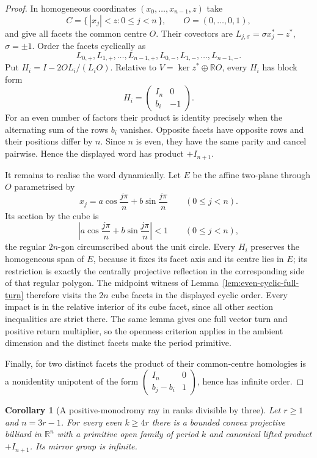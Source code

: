 \documentclass[11pt,a4paper]{article}
\theoremstyle{plain}
\newtheorem{corollary}[theorem]{Corollary}
\theoremstyle{definition}
\theoremstyle{remark}
\begin{document}
\begin{proof}
In homogeneous coordinates $(x_0,\ldots,x_{n-1},z)$ take
\[
 C=\{\,|x_j|<z:0\le j<n\,\},\qquad O=(0,\ldots,0,1),
\]
and give all facets the common centre $O$.  Their covectors are
$L_{j,\sigma}=\sigma x_j^*-z^*$, $\sigma=\pm1$.  Order the facets cyclically as
\[
 L_{0,+},L_{1,+},\ldots,L_{n-1,+},
 L_{0,-},L_{1,-},\ldots,L_{n-1,-}.
\]
Put $H_i=I-2OL_i/(L_iO)$.  Relative to
$V=\ker z^*\oplus\mathbb RO$, every $H_i$ has block form
\[
                    H_i=\begin{pmatrix}I_n&0\\ b_i&-1\end{pmatrix}.
\]
For an even number of factors their product is identity precisely when the
alternating sum of the rows $b_i$ vanishes.  Opposite facets have opposite rows
and their positions differ by $n$.  Since $n$ is even, they have the same parity
and cancel pairwise.  Hence the displayed word has product $+I_{n+1}$.

It remains to realise the word dynamically.  Let $E$ be the affine two-plane
through $O$ parametrised by
\[
 x_j=a\cos\frac{j\pi}{n}+b\sin\frac{j\pi}{n}\qquad(0\le j<n).
\]
Its section by the cube is
\[
 \left|a\cos\frac{j\pi}{n}+b\sin\frac{j\pi}{n}\right|<1
 \qquad(0\le j<n),
\]
the regular $2n$-gon circumscribed about the unit circle.  Every $H_i$ preserves
the homogeneous span of $E$, because it fixes its facet axis and its centre lies
in $E$; its restriction is exactly the centrally projective reflection in the
corresponding side of that regular polygon.  The midpoint witness of
Lemma~\ref{lem:even-cyclic-full-turn} therefore visits the $2n$ cube facets in
the displayed cyclic order.  Every impact is in the relative interior of its
cube facet, since all other section inequalities are strict there.  The same
lemma gives one full vector turn and positive return multiplier, so the openness
criterion applies in the ambient dimension and the distinct facets make the
period primitive.

Finally, for two distinct facets the product of their common-centre homologies is
a nonidentity unipotent of the form
$\left(\begin{smallmatrix}I_n&0\\ b_j-b_i&1\end{smallmatrix}\right)$, hence has
infinite order.
\end{proof}

\begin{corollary}[A positive-monodromy ray in ranks divisible by three]
\label{cor:join-positive-ray}
Let $r\ge1$ and $n=3r-1$.  For every even $k\ge4r$ there is a bounded convex
projective billiard in $\mathbb R^n$ with a primitive open family of period $k$
and canonical lifted product $+I_{n+1}$.  Its mirror group is infinite.
\end{corollary}
\end{document}
